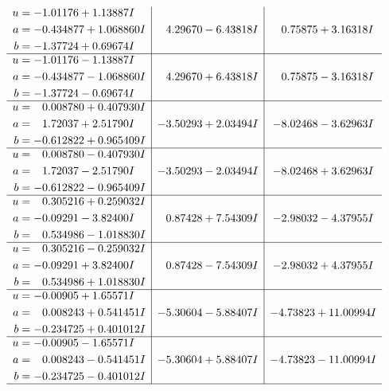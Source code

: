\documentclass[1p]{elsarticle_modified}
\theoremstyle{definition}
\begin{document}
$$\begin{array}{c|c|c}
\begin{aligned}
u &= -1.01176 + 1.13887 I \\
a &= -0.434877 + 1.068860 I \\
b &= -1.37724 + 0.69674 I\end{aligned}
 & \phantom{-}4.29670 - 6.43818 I & \phantom{-}0.75875 + 3.16318 I \\ \hline\begin{aligned}
u &= -1.01176 - 1.13887 I \\
a &= -0.434877 - 1.068860 I \\
b &= -1.37724 - 0.69674 I\end{aligned}
 & \phantom{-}4.29670 + 6.43818 I & \phantom{-}0.75875 - 3.16318 I \\ \hline\begin{aligned}
u &= \phantom{-}0.008780 + 0.407930 I \\
a &= \phantom{-}1.72037 + 2.51790 I \\
b &= -0.612822 + 0.965409 I\end{aligned}
 & -3.50293 + 2.03494 I & -8.02468 - 3.62963 I \\ \hline\begin{aligned}
u &= \phantom{-}0.008780 - 0.407930 I \\
a &= \phantom{-}1.72037 - 2.51790 I \\
b &= -0.612822 - 0.965409 I\end{aligned}
 & -3.50293 - 2.03494 I & -8.02468 + 3.62963 I \\ \hline\begin{aligned}
u &= \phantom{-}0.305216 + 0.259032 I \\
a &= -0.09291 - 3.82400 I \\
b &= \phantom{-}0.534986 - 1.018830 I\end{aligned}
 & \phantom{-}0.87428 + 7.54309 I & -2.98032 - 4.37955 I \\ \hline\begin{aligned}
u &= \phantom{-}0.305216 - 0.259032 I \\
a &= -0.09291 + 3.82400 I \\
b &= \phantom{-}0.534986 + 1.018830 I\end{aligned}
 & \phantom{-}0.87428 - 7.54309 I & -2.98032 + 4.37955 I \\ \hline\begin{aligned}
u &= -0.00905 + 1.65571 I \\
a &= \phantom{-}0.008243 + 0.541451 I \\
b &= -0.234725 + 0.401012 I\end{aligned}
 & -5.30604 - 5.88407 I & -4.73823 + 11.00994 I \\ \hline\begin{aligned}
u &= -0.00905 - 1.65571 I \\
a &= \phantom{-}0.008243 - 0.541451 I \\
b &= -0.234725 - 0.401012 I\end{aligned}
 & -5.30604 + 5.88407 I & -4.73823 - 11.00994 I\\
 \hline 
 \end{array}$$\newpage
\end{document}
